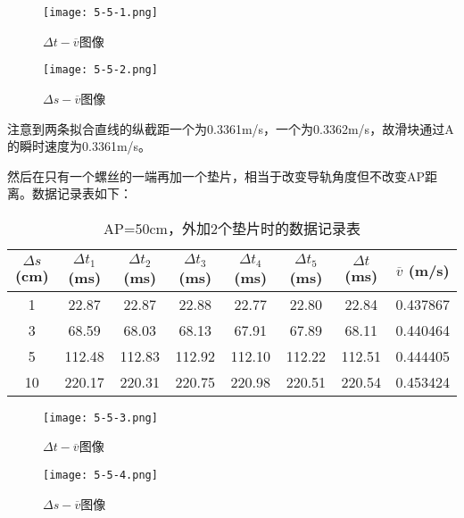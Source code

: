 \documentclass[12pt]{article}
\begin{document}
\begin{figure}[htbp]
    \begin{minipage}[h]{0.5\linewidth}
        \centering
        \texttt{[image: 5-5-1.png]}
        \caption{$\Delta t-\overline{v}$图像}
    \end{minipage}
    \begin{minipage}[h]{0.5\linewidth}
        \centering
        \texttt{[image: 5-5-2.png]}
        \caption{$\Delta s-\overline{v}$图像}
    \end{minipage}
\end{figure}

注意到两条拟合直线的纵截距一个为0.3361m/s，一个为0.3362m/s，故滑块通过A的瞬时速度为0.3361m/s。

然后在只有一个螺丝的一端再加一个垫片，相当于改变导轨角度但不改变AP距离。数据记录表如下：

\begin{table}[htbp]
    \centering
    \begin{tabular}{|c|c|c|c|c|c|c|c|}
    \hline
    $\Delta s$ (cm) & $\Delta t_1$ (ms) & $\Delta t_2$ (ms) & $\Delta t_3$ (ms) & $\Delta t_4$ (ms) & $\Delta t_5$ (ms) & $\Delta t$ (ms) & $\overline{v}$ (m/s) \\
    \hline
    1    & 22.87  & 22.87  & 22.88  & 22.77  & 22.80  & 22.84  & 0.437867 \\
    \hline
    3    & 68.59  & 68.03  & 68.13  & 67.91  & 67.89  & 68.11  & 0.440464 \\
    \hline
    5    & 112.48  & 112.83  & 112.92  & 112.10  & 112.22  & 112.51  & 0.444405 \\
    \hline
    10   & 220.17  & 220.31  & 220.75  & 220.98  & 220.51  & 220.54  & 0.453424 \\
    \hline
    \end{tabular}
    \caption{AP=50cm，外加2个垫片时的数据记录表}
\end{table}

\begin{figure}[h!]
    \begin{minipage}[t]{0.5\linewidth}
        \centering
        \texttt{[image: 5-5-3.png]}
        \caption{$\Delta t-\overline{v}$图像}
    \end{minipage}
    \begin{minipage}[t]{0.5\linewidth}
        \centering
        \texttt{[image: 5-5-4.png]}
        \caption{$\Delta s-\overline{v}$图像}
    \end{minipage}
\end{figure}
\end{document}
